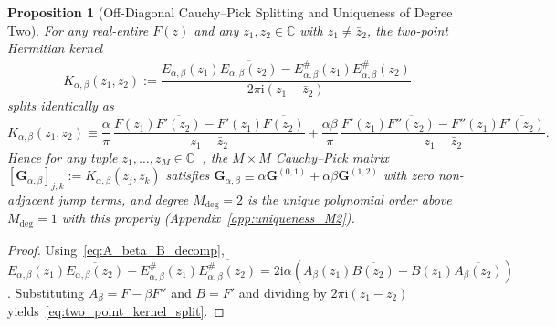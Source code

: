 \documentclass[11pt,reqno]{amsart}
\newtheorem{proposition}[theorem]{Proposition}
\theoremstyle{definition}
\theoremstyle{remark}
\numberwithin{equation}{section}
\newcommand{\C}{\mathbb{C}}
\newcommand{\ii}{\mathrm{i}}
\begin{document}
\begin{proposition}[Off-Diagonal Cauchy--Pick Splitting and Uniqueness of Degree Two]\label{prop:cauchy_pick_splitting}
For any real-entire $F(z)$ and any $z_1, z_2 \in \C$ with $z_1 \neq \bar{z}_2$, the two-point Hermitian kernel
\begin{equation}\label{eq:two_point_kernel_def}
K_{\alpha,\beta}(z_1, z_2) := \frac{E_{\alpha,\beta}(z_1)\overline{E_{\alpha,\beta}(z_2)} - E_{\alpha,\beta}^\#(z_1)\overline{E_{\alpha,\beta}^\#(z_2)}}{2\pi\ii(z_1 - \bar{z}_2)}
\end{equation}
splits identically as
\begin{equation}\label{eq:two_point_kernel_split}
K_{\alpha,\beta}(z_1, z_2) \equiv \frac{\alpha}{\pi}\,\frac{F(z_1)\overline{F'(z_2)} - F'(z_1)\overline{F(z_2)}}{z_1 - \bar{z}_2} + \frac{\alpha\beta}{\pi}\,\frac{F'(z_1)\overline{F''(z_2)} - F''(z_1)\overline{F'(z_2)}}{z_1 - \bar{z}_2}.
\end{equation}
Hence for any tuple $z_1, \dots, z_M \in \C_-$, the $M \times M$ Cauchy--Pick matrix $[\mathbf{G}_{\alpha,\beta}]_{j,k} := K_{\alpha,\beta}(z_j, z_k)$ satisfies $\mathbf{G}_{\alpha,\beta} \equiv \alpha\mathbf{G}^{(0,1)} + \alpha\beta\mathbf{G}^{(1,2)}$ with zero non-adjacent jump terms, and degree $M_{\mathrm{deg}} = 2$ is the unique polynomial order above $M_{\mathrm{deg}} = 1$ with this property (Appendix~\ref{app:uniqueness_M2}).
\end{proposition}

\begin{proof}
Using~\eqref{eq:A_beta_B_decomp}, $E_{\alpha,\beta}(z_1)\overline{E_{\alpha,\beta}(z_2)} - E_{\alpha,\beta}^\#(z_1)\overline{E_{\alpha,\beta}^\#(z_2)} = 2\ii\alpha(A_\beta(z_1)\overline{B(z_2)} - B(z_1)\overline{A_\beta(z_2)})$. Substituting $A_\beta = F - \beta F''$ and $B = F'$ and dividing by $2\pi\ii(z_1 - \bar{z}_2)$ yields~\eqref{eq:two_point_kernel_split}.
\end{proof}
\end{document}
